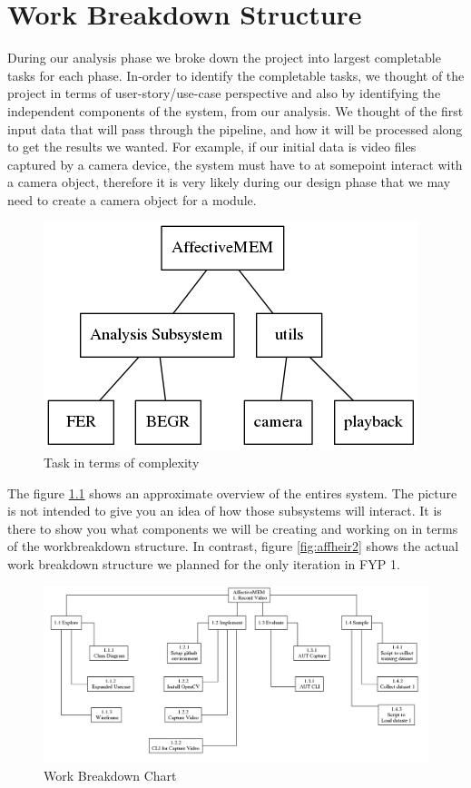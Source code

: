 \documentclass[12pt,a4paper,man]{report}
\begin{document}
\chapter{Work Breakdown Structure}
\label{sec:org4d26fee}
During our analysis phase we broke down the project into largest completable tasks for each phase. In-order to identify the completable tasks, we thought of the project in terms of user-story/use-case perspective and also by identifying the independent components of the system, from our analysis. We thought of the first input data that will pass through the pipeline, and how it will be processed along to get the results we wanted. For example, if our initial data is video files captured by a camera device, the system must have to at somepoint interact with a camera object, therefore it is very likely during our design phase that we may need to create a camera object for a module.


\begin{figure}[htbp]
\centering
\includegraphics[width=.9\linewidth]{img/wbs1.png}
\caption{\label{fig:affheir}
Task in terms of complexity}
\end{figure}



The figure \ref{fig:affheir} shows an approximate overview of the entires system. The picture is not intended to give you an idea of how those subsystems will interact. It is there to show you what components we will be creating and working on in terms of the workbreakdown structure. In contrast, figure \ref{fig:affheir2} shows the actual work breakdown structure we planned for the only iteration in FYP 1.

\begin{figure}[htbp]
\centering
\includegraphics[width=.9\linewidth]{img/wbs2.png}
\caption{Work Breakdown Chart}
\end{figure}
\end{document}
